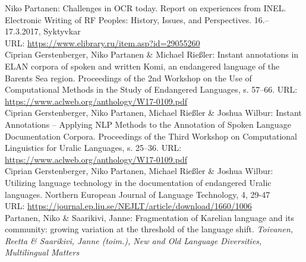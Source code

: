 \documentclass[11pt, a4paper]{article}
\newcommand{\years}[1]{\marginnote{\scriptsize #1}} %
\begin{document}
\years{2017} Niko Partanen: Challenges in OCR today. Report on experiences from INEL. Electronic Writing of RF Peoples: History, Issues, and Perspectives. 16.--17.3.2017, Syktyvkar
\\URL: \url{https://www.elibrary.ru/item.asp?id=29055260}\\

\years{2017} Ciprian Gerstenberger, Niko Partanen \& Michael Rießler: Instant annotations in ELAN corpora of spoken and written Komi, an endangered language of the Barents Sea region. Proceedings of the 2nd Workshop on the Use of Computational Methods in the Study of Endangered Languages, s. 57--66.
URL: \url{https://www.aclweb.org/anthology/W17-0109.pdf}\\

\years{2017} Ciprian Gerstenberger, Niko Partanen, Michael Rießler \& Joshua Wilbur: Instant Annotations -- Applying NLP Methods to the Annotation of Spoken Language Documentation Corpora. Proceedings of the Third Workshop on Computational Linguistics for Uralic Languages, s. 25--36.
URL: \url{https://www.aclweb.org/anthology/W17-0109.pdf}\\

\years{2016} Ciprian Gerstenberger, Niko Partanen, Michael Rießler \& Joshua Wilbur: Utilizing language technology in the documentation of endangered Uralic languages. Northern European Journal of Language Technology, 4, 29-47 \\
URL: \url{https://journal.ep.liu.se/NEJLT/article/download/1660/1006}\\

\years{2016} Partanen, Niko \& Saarikivi, Janne: Fragmentation of Karelian language and its community: growing variation at the threshold of the language shift. \emph{Toivanen, Reetta \& Saarikivi, Janne (toim.), New and Old Language Diversities, Multilingual Matters}\\

\end{document}
